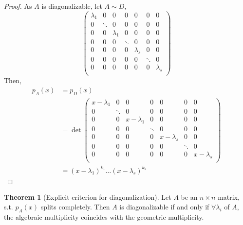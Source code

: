 \documentclass[fleqn, a4paper, 12pt, draft]{article}
\theoremstyle{definition}
\theoremstyle{theorem}
\newtheorem{theorem}{Theorem} %
\theoremstyle{remark}
\numberwithin{corollary}{theorem}
\numberwithin{equation}{theorem}
\begin{document}
\begin{proof}
	As $A$ is diagonalizable, let $A \sim D$, 
	\begin{equation*}
		\begin{pmatrix}
			\lambda_1 & 0 & 0 & 0 & 0 & 0 & 0\\
			0 & \ddots & 0 & 0 & 0 & 0 & 0\\
			0 & 0 & \lambda_1 & 0 & 0 & 0 & 0\\
			0 & 0 & 0 & \ddots & 0 & 0 & 0 \\
			0 & 0 & 0 & 0 & \lambda_s & 0 & 0\\		
			0 & 0 & 0 & 0 & 0 & \ddots & 0\\
			0 & 0 & 0 & 0 & 0 & 0 & \lambda_s\\			
		\end{pmatrix}
	\end{equation*}
	Then, 
	\begin{align*}
		p_A (x) &= p_D (x)\\
		&= \det 
			\begin{pmatrix}
				x - \lambda_1 & 0 & 0 & 0 & 0 & 0 & 0\\
				0 & \ddots & 0 & 0 & 0 & 0 & 0\\
				0 & 0 & x - \lambda_1 & 0 & 0 & 0 & 0\\
				0 & 0 & 0 & \ddots & 0 & 0 & 0 \\
				0 & 0 & 0 & 0 & x - \lambda_s & 0 & 0\\		
				0 & 0 & 0 & 0 & 0 & \ddots & 0\\
				0 & 0 & 0 & 0 & 0 & 0 & x - \lambda_s\\	
			\end{pmatrix}\\
		&= (x - \lambda_1)^{k_1} \dots (x - \lambda_s)^{k_s}
	\end{align*}
\end{proof}

\begin{theorem}[Explicit criterion for diagonalization]
	Let $A$ be an $n \times n$ matrix, s.t. $p_A (x)$ splits completely. Then $A$ is diagonalizable if and only if $\forall \lambda_i$ of $A$, the algebraic multiplicity coincides with the geometric multiplicity.
\end{theorem}
\end{document}
